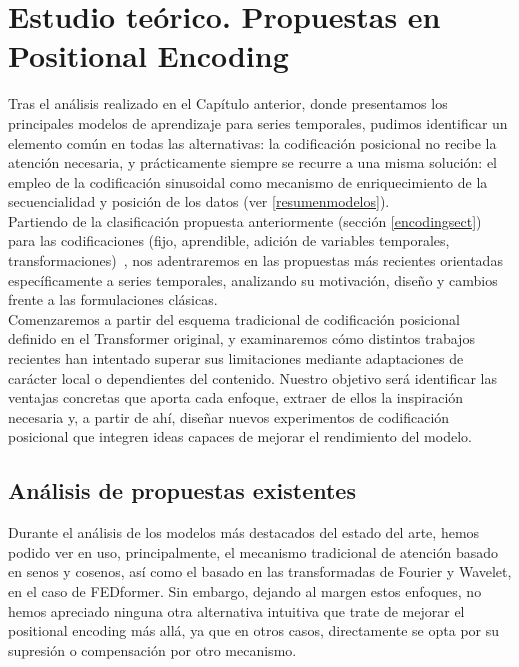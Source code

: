 \chapter{Estudio teórico. Propuestas en Positional Encoding}
\label{codificacionescap}

Tras el análisis realizado en el Capítulo anterior, donde presentamos los principales modelos de aprendizaje para series temporales, pudimos identificar un elemento común en todas las alternativas: la codificación posicional no recibe la atención necesaria, y prácticamente siempre se recurre a una misma solución: el empleo de la codificación sinusoidal como mecanismo de enriquecimiento de la secuencialidad y posición de los datos (ver \ref{resumenmodelos}).\\

Partiendo de la clasificación propuesta anteriormente (sección \ref{encodingsect}) para las codificaciones (fijo, aprendible, adición de variables temporales, transformaciones)~\cite{irani2025positionalencodingtransformerbasedtime}, nos adentraremos en las propuestas más recientes orientadas específicamente a series temporales, analizando su motivación, diseño y cambios frente a las formulaciones clásicas.\\

Comenzaremos a partir del esquema tradicional de codificación posicional definido en el Transformer original, y examinaremos cómo distintos trabajos recientes han intentado superar sus limitaciones mediante adaptaciones de carácter local o dependientes del contenido. Nuestro objetivo será identificar las ventajas concretas que aporta cada enfoque, extraer de ellos la inspiración necesaria y, a partir de ahí, diseñar nuevos experimentos de codificación posicional que integren ideas capaces de mejorar el rendimiento del modelo.

\section{Análisis de propuestas existentes}

Durante el análisis de los modelos más destacados del estado del arte, hemos podido ver en uso, principalmente, el mecanismo tradicional de atención basado en senos y cosenos, así como el basado en las transformadas de Fourier y Wavelet, en el caso de FEDformer. Sin embargo, dejando al margen estos enfoques, no hemos apreciado ninguna otra alternativa intuitiva que trate de mejorar el positional encoding más allá, ya que en otros casos, directamente se opta por su supresión o compensación por otro mecanismo.\\

